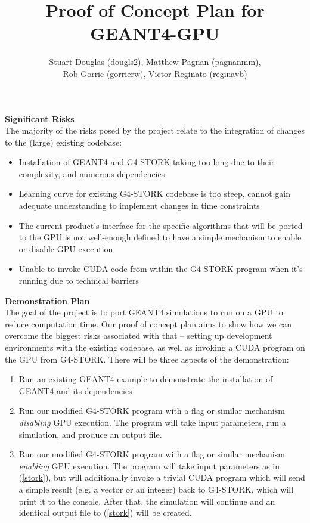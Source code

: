 \documentclass[12pt]{article}
\begin{document}
\title{\vspace{-4em}Proof of Concept Plan for GEANT4-GPU} \author{Stuart Douglas
(dougls2), Matthew Pagnan (pagnanmm), \\ Rob Gorrie (gorrierw), Victor Reginato
(reginavb)}
	
\maketitle

\textbf{Significant Risks}\\
The majority of the risks posed by the project relate to the integration of changes to the (large) existing codebase:
\begin{itemize}
\item Installation of GEANT4 and G4-STORK taking too long due to their complexity, and numerous dependencies
\item Learning curve for existing G4-STORK codebase is too steep, cannot gain adequate understanding to implement changes in time constraints
\item The current product's interface for the specific algorithms that will be ported to the GPU is not well-enough defined to have a simple mechanism to enable or disable GPU execution
\item Unable to invoke CUDA code from within the G4-STORK program when it's running due to technical barriers
\end{itemize}

\textbf{Demonstration Plan}\\
The goal of the project is to port GEANT4 simulations to run on a GPU to reduce computation time. Our proof of concept plan aims to show how we can overcome the biggest risks associated with that -- setting up development environments with the existing codebase, as well as invoking a CUDA program on the GPU from G4-STORK.
There will be three aspects of the demonstration:

\begin{enumerate}
\item Run an existing GEANT4 example to demonstrate the installation of GEANT4 and its dependencies
\item \label{stork} Run our modified G4-STORK program with a flag or similar mechanism \emph{disabling} GPU execution. The program will take input parameters, run a simulation, and produce an output file.
\item Run our modified G4-STORK program with a flag or similar mechanism \emph{enabling} GPU execution. The program will take input parameters as in (\ref{stork}), but will additionally invoke a trivial CUDA program which will send a simple result (e.g. a vector or an integer) back to G4-STORK, which will print it to the console. After that, the simulation will continue and an identical output file to (\ref{stork}) will be created.
\end{enumerate}
\end{document}
